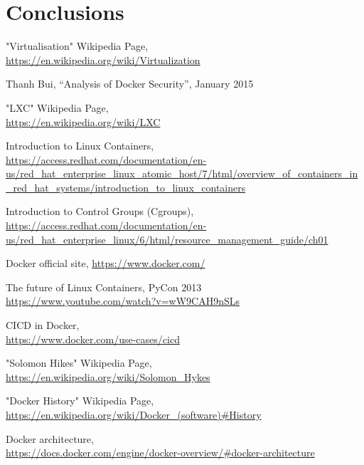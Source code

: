 \documentclass[a4paper,12pt]{article}
\begin{document}
\newpage

\section{Conclusions}

\newpage

\begin{thebibliography}{99}

"Virtualisation" Wikipedia Page,\\ \url{https://en.wikipedia.org/wiki/Virtualization}

Thanh Bui,
``Analysis of Docker Security'',
January 2015

"LXC" Wikipedia Page,\\ \url{https://en.wikipedia.org/wiki/LXC}

Introduction to Linux Containers,\\ \url{https://access.redhat.com/documentation/en-us/red_hat_enterprise_linux_atomic_host/7/html/overview_of_containers_in_red_hat_systems/introduction_to_linux_containers}
  
Introduction to Control Groups (Cgroups),\\ \url{https://access.redhat.com/documentation/en-us/red_hat_enterprise_linux/6/html/resource_management_guide/ch01}

Docker official site, \url{https://www.docker.com/}

The future of Linux Containers, PyCon 2013\\ \url{https://www.youtube.com/watch?v=wW9CAH9nSLs}

CI\/CD in Docker,\\ \url{https://www.docker.com/use-cases/cicd}

"Solomon Hikes" Wikipedia Page,\\ \url{https://en.wikipedia.org/wiki/Solomon_Hykes}

"Docker History" Wikipedia Page,\\ \url{https://en.wikipedia.org/wiki/Docker_(software)#History}

Docker architecture,\\ \url{https://docs.docker.com/engine/docker-overview/#docker-architecture}


\end{thebibliography}
\end{document}
